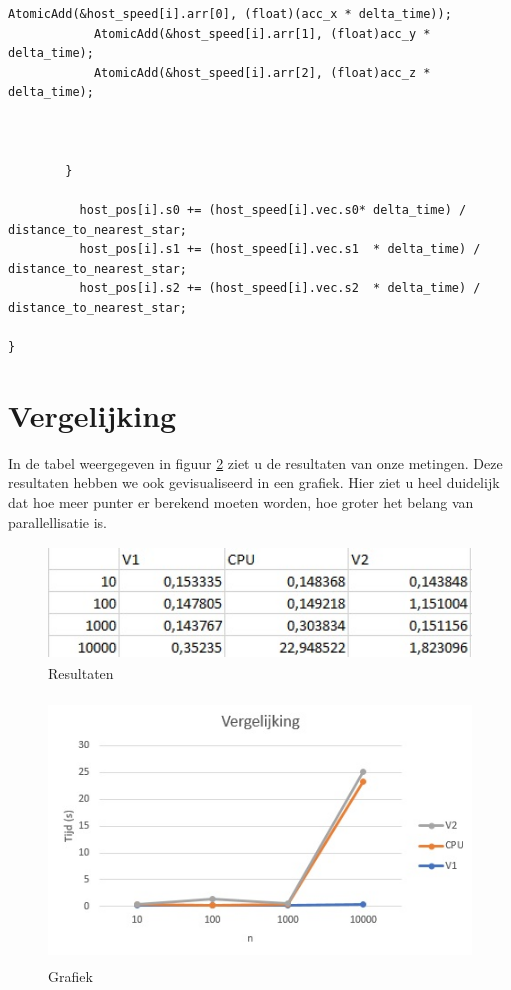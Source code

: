 \documentclass[11pt,a4paper]{article}
\begin{document}
\begin{lstlisting}[style=CStyle]
			AtomicAdd(&host_speed[i].arr[0], (float)(acc_x * delta_time));
    		AtomicAdd(&host_speed[i].arr[1], (float)acc_y * delta_time);
    		AtomicAdd(&host_speed[i].arr[2], (float)acc_z * delta_time);



        }

      	  host_pos[i].s0 += (host_speed[i].vec.s0* delta_time) / distance_to_nearest_star;
      	  host_pos[i].s1 += (host_speed[i].vec.s1  * delta_time) / distance_to_nearest_star;
       	  host_pos[i].s2 += (host_speed[i].vec.s2  * delta_time) / distance_to_nearest_star;
   		
}
		\end{lstlisting}
		
	\section{Vergelijking}
	In de tabel weergegeven in figuur \ref{tabel} ziet u de resultaten van onze metingen. Deze resultaten hebben we ook gevisualiseerd in een grafiek. Hier ziet u heel duidelijk dat hoe meer punter er berekend moeten worden, hoe groter het belang van parallellisatie is.
	
	\begin{figure}[htbp]
		\caption{Resultaten}
		\label{tabel}
		\centerline{\includegraphics[height=3cm]{waarden.jpg}}
	\end{figure}
	\begin{figure}[htbp]
		\caption{Grafiek}
		\label{tabel}
		\centerline{\includegraphics[height=7cm]{grafiek.jpg}}
	\end{figure}
\end{document}
